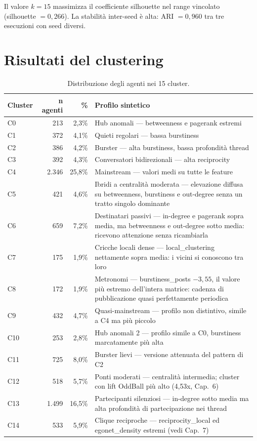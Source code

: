 \documentclass[12pt,a4paper]{report}
\begin{document}
Il valore $k=15$ massimizza il coefficiente silhouette nel range vincolato (silhouette $= 0{,}266$). La stabilità inter-seed è alta: ARI $= 0{,}960$ tra tre esecuzioni con seed diversi.

\section{Risultati del clustering}

\begin{table}[H]
\centering
\caption{Distribuzione degli agenti nei 15 cluster.}
\label{tab:cluster-distribution}
\begin{tabular}{@{}lrrp{7.2cm}@{}}
\toprule
Cluster & n agenti & \% & Profilo sintetico \\
\midrule
C0  & 213   & 2,3\%  & Hub anomali — betweenness e pagerank estremi \\
C1  & 372   & 4,1\%  & Quieti regolari — bassa burstiness \\
C2  & 386   & 4,2\%  & Burster — alta burstiness, bassa profondità thread \\
C3  & 392   & 4,3\%  & Conversatori bidirezionali — alta reciprocity \\
C4  & 2.346 & 25,8\% & Mainstream — valori medi su tutte le feature \\
C5  & 421   & 4,6\%  & Ibridi a centralità moderata — elevazione diffusa su betweenness, burstiness e out-degree senza un tratto singolo dominante \\
C6  & 659   & 7,2\%  & Destinatari passivi — in-degree e pagerank sopra media, ma betweenness e out-degree sotto media: ricevono attenzione senza ricambiarla \\
C7  & 175   & 1,9\%  & Cricche locali dense — local\_clustering nettamente sopra media: i vicini si conoscono tra loro \\
C8  & 172   & 1,9\%  & Metronomi — burstiness\_posts $-3{,}55$, il valore più estremo dell'intera matrice: cadenza di pubblicazione quasi perfettamente periodica \\
C9  & 432   & 4,7\%  & Quasi-mainstream — profilo non distintivo, simile a C4 ma più piccolo \\
C10 & 253   & 2,8\%  & Hub anomali 2 — profilo simile a C0, burstiness marcatamente più alta \\
C11 & 725   & 8,0\%  & Burster lievi — versione attenuata del pattern di C2 \\
C12 & 518   & 5,7\%  & Ponti moderati — centralità intermedia; cluster con lift OddBall più alto (4,53x, Cap.~6) \\
C13 & 1.499 & 16,5\% & Partecipanti silenziosi — in-degree sotto media ma alta profondità di partecipazione nei thread \\
C14 & 533   & 5,9\%  & Clique reciproche — reciprocity\_local ed egonet\_density estremi (vedi Cap.~7) \\
\bottomrule
\end{tabular}
\end{table}
\end{document}
